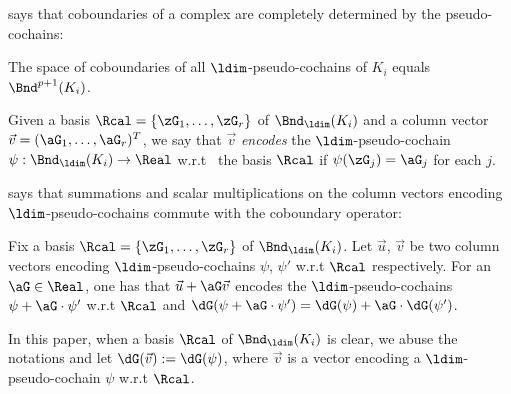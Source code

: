 says that coboundaries of
a complex  are completely determined by the pseudo-cochains:

\begin{proposition}\label{prop:pseudocob-is-cob}
The space of coboundaries of all 
$\ldim$-pseudo-cochains of $K_i$ equals $\Bnd^{p+1}(K_i)$.
\end{proposition}

\begin{definition}
Given
a basis $\Rcal=\{\zG_1,\ldots,\zG_r\}$ of $\Bnd_\ldim(K_i)$
and
a column vector $\vec{v}=(\aG_1,\ldots,\aG_r)^T$,
we say that  $\vec{v}$ \emph{encodes} 
the $\ldim$-pseudo-cochain $\psi:\Bnd_\ldim(K_i)\to\Real$
w.r.t\ 
the basis $\Rcal$
if $\psi(\zG_j)=\aG_j$ for each $j$.
\end{definition}

says that summations and scalar multiplications
on the column vectors encoding 
$\ldim$-pseudo-cochains
commute with
the coboundary operator:

\begin{proposition}\label{prop:pseudo-coc-nat}
Fix
a basis $\Rcal=\{\zG_1,\ldots,\zG_r\}$ of $\Bnd_\ldim(K_i)$.
Let
$\vec{u}$, $\vec{v}$
be two column vectors encoding 
$\ldim$-pseudo-cochains $\psi$, $\psi'$
w.r.t $\Rcal$ respectively.
For an $\aG\in\Real$,
one has that $\vec{u}+\aG\vec{v}$ encodes
the $\ldim$-pseudo-cochains $\psi+\aG\cdot\psi'$
w.r.t $\Rcal$
and $\dG(\psi+\aG\cdot\psi')=\dG(\psi)+\aG\cdot\dG(\psi')$.
\end{proposition}

In this paper, when a basis
$\Rcal$ of $\Bnd_\ldim(K_i)$ is clear,
we abuse the notations and let $\dG(\vec{v}):=\dG(\psi)$,
where
$\vec{v}$ is a vector
encoding
a $\ldim$-pseudo-cochain $\psi$ w.r.t $\Rcal$.

